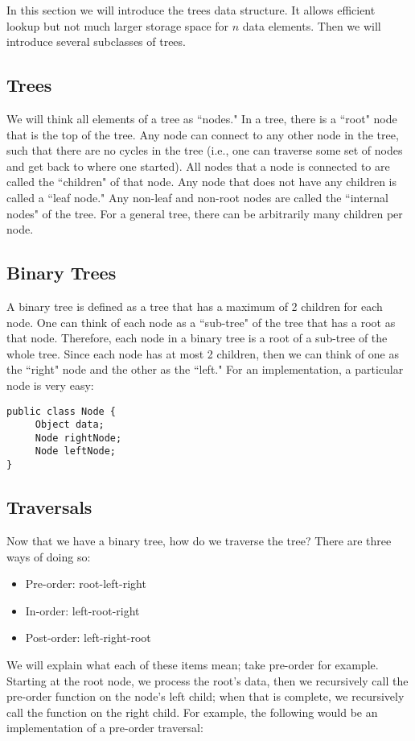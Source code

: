 %
In this section we will introduce the trees data structure. It allows efficient lookup but not much larger storage space for $n$ data elements. Then we will introduce several subclasses of trees.

\subsection*{Trees}
We will think all elements of a tree as ``nodes." In a tree, there is a ``root" node that is the top of the tree. Any node can connect to any other node in the tree, such that there are no cycles in the tree (i.e., one can traverse some set of nodes and get back to where one started). All nodes that a node is connected to are called the ``children" of that node. Any node that does not have any children is called a ``leaf node." Any non-leaf and non-root nodes are called the ``internal nodes" of the tree. For a general tree, there can be arbitrarily many children per node.

\subsection*{Binary Trees}
A binary tree is defined as a tree that has a maximum of 2 children for each node. One can think of each node as a ``sub-tree" of the tree that has a root as that node. Therefore, each node in a binary tree is a root of a sub-tree of the whole tree. Since each node has at most 2 children, then we can think of one as the ``right" node and the other as the ``left." For an implementation, a particular node is very easy:

\begin{lstlisting}
public class Node {
     Object data;
     Node rightNode;
     Node leftNode;
}
\end{lstlisting}

\subsection*{Traversals}
Now that we have a binary tree, how do we traverse the tree? There are three ways of doing so:
\begin{itemize}
\item Pre-order: root-left-right
\item In-order: left-root-right
\item Post-order: left-right-root
\end{itemize}
We will explain what each of these items mean; take pre-order for example. Starting at the root node, we process the root's data, then we recursively call the pre-order function on the node's left child; when that is complete, we recursively call the function on the right child. For example, the following would be an implementation of a pre-order traversal:


